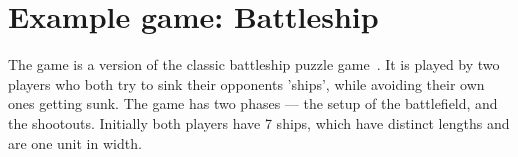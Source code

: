 





%

\chapter{Example game: Battleship}\label{sect:Example}


	The game is a version of the classic battleship puzzle game~\cite{Battleship}. It is played by two players who both try to sink their opponents 'ships', while avoiding their own ones getting sunk.
	The game has two phases --- the setup of the battlefield, and the shootouts.
	Initially both players have 7 ships, which have distinct lengths and are one unit in width.
	
